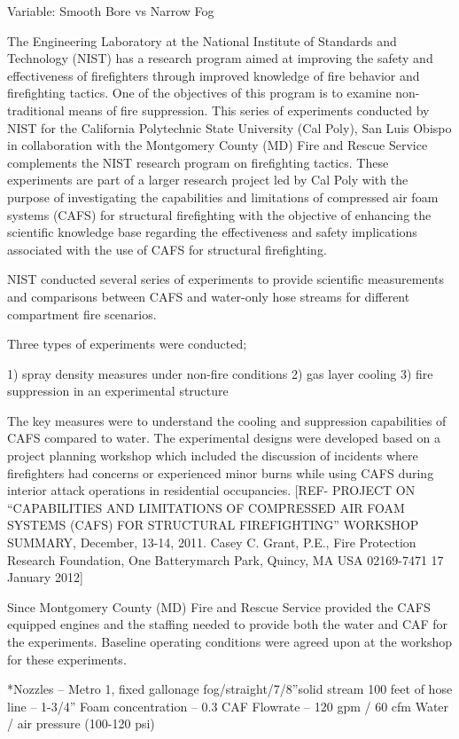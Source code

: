 \documentclass[12pt,oneside]{book}
\begin{document}
Variable: 
Smooth Bore vs Narrow Fog

The Engineering Laboratory at the National Institute of Standards and Technology (NIST) has a research program aimed at improving the safety and effectiveness of firefighters through improved knowledge of fire behavior and firefighting tactics.  One of the objectives of this program is to examine non-traditional means of fire suppression.   This series of experiments conducted by NIST for the California Polytechnic State University (Cal Poly), San Luis Obispo in collaboration with the Montgomery County (MD) Fire and Rescue Service complements the NIST research program on firefighting tactics.  These experiments are part of a larger research project led by Cal Poly with the purpose of investigating the capabilities and limitations of compressed air foam systems (CAFS) for structural firefighting with the objective of enhancing the scientific knowledge base regarding the effectiveness and safety implications associated with the use of CAFS for structural firefighting.
  
NIST conducted several series of experiments to provide scientific measurements and comparisons between CAFS and water-only hose streams for different compartment fire scenarios.  

Three types of experiments were conducted; 

1)            spray density measures under non-fire conditions 
2)            gas layer cooling 
3)            fire suppression in an experimental structure

The key measures were to understand the cooling and suppression capabilities of CAFS compared to water.   The experimental designs were developed based on a project planning workshop which included the discussion of incidents where firefighters had concerns or experienced minor burns while using CAFS during interior attack operations in residential occupancies.  [REF-  PROJECT ON “CAPABILITIES AND LIMITATIONS OF COMPRESSED AIR FOAM SYSTEMS (CAFS) FOR STRUCTURAL FIREFIGHTING” WORKSHOP SUMMARY, December, 13-14, 2011.   Casey C. Grant, P.E., Fire Protection Research Foundation, One Batterymarch Park, Quincy, MA USA 02169-7471
17 January 2012]

Since Montgomery County (MD) Fire and Rescue Service provided the CAFS equipped engines and the staffing needed to provide both the water and CAF for the experiments.  Baseline operating conditions were agreed upon at the workshop for these experiments. 

*Nozzles – Metro 1, fixed gallonage fog/straight/7/8”solid stream  
100 feet of hose line – 1-3/4”
Foam concentration – 0.3%
CAF Flowrate – 120 gpm / 60 cfm 
Water / air pressure (100-120 psi)
\end{document}

